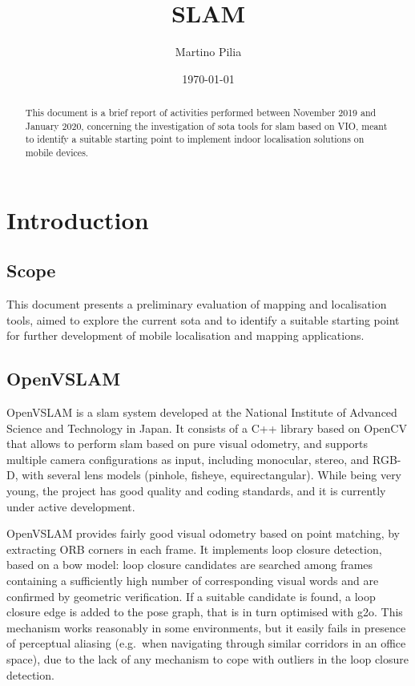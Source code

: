 \documentclass[11pt, letterpaper, twoside]{article}
\title{SLAM}
\author{Martino Pilia}
\date{\today}
\begin{document}
\maketitle

\begin{abstract}
    This document is a brief report of activities performed between November 2019
    and January 2020, concerning the investigation of \gls{sota} tools
    for \gls{slam} based on \gls{VIO}, meant to identify a suitable starting point
    to implement indoor localisation solutions on mobile devices.
\end{abstract}

\tableofcontents

\glsfindwidesttoplevelname[\acronymtype]
\printglossary[type=\acronymtype,style=alttree,title=Abbreviations,nonumberlist]

\newpage

\section{Introduction}

\subsection{Scope}

This document presents a preliminary evaluation of mapping and localisation
tools, aimed to explore the current \gls{sota} and to identify a suitable
starting point for further development of mobile localisation and mapping
applications.

\subsection{OpenVSLAM}

OpenVSLAM\cite{openvslam2019} is a \gls{slam} system developed at the National
Institute of Advanced Science and Technology in Japan. It consists of a C++
library based on OpenCV that allows to perform \gls{slam} based on pure visual
odometry, and supports multiple camera configurations as input, including
monocular, stereo, and RGB-D, with several lens models (pinhole, fisheye,
equirectangular). While being very young, the project has good quality and
coding standards, and it is currently under active development.

OpenVSLAM provides fairly good visual odometry based on point matching, by
extracting ORB corners\cite{rublee2011orb} in each frame. It implements loop
closure detection, based on a \gls{bow} model: loop closure candidates are
searched among frames containing a sufficiently high number of corresponding
visual words and are confirmed by geometric verification. If a suitable
candidate is found, a loop closure edge is added to the pose graph, that is in
turn optimised with g2o\cite{grisetti2011g2o}. This mechanism works reasonably
in some environments, but it easily fails in presence of perceptual aliasing
(e.g.\ when navigating through similar corridors in an office space), due to
the lack of any mechanism to cope with outliers in the loop closure detection.
\end{document}
